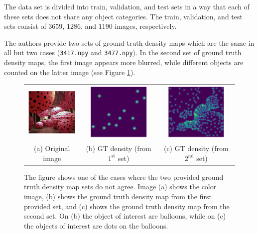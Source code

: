 The data set is divided into train, validation, and test sets in a way that each of these sets does not share any object categories. The train, validation, and test sets consist of $3659$, $1286$, and $1190$ images, respectively.

The authors provide two sets of ground truth density maps which are the same in all but two cases (\texttt{3417.npy} and \texttt{3477.npy}). In the second set of ground truth density maps, the first image appears more blurred, while different objects are counted on the latter image (see Figure \ref{fig:gtsets}).

\begin{figure}[htb]
	\centering
	\begin{tabular}{ccc}
		\includegraphics[width=3.1cm]{fig/ds_3.png} &
		\includegraphics[width=3.1cm]{fig/ds_1.png} &
		\includegraphics[width=3.1cm]{fig/ds_2.png} \\
		(a) Original image & (b) GT density (from $1^{\text{st}}$ set) & (c) GT density (from $2^{\text{nd}}$ set) \\
	\end{tabular}
	\caption{The figure shows one of the cases where the two provided ground truth density map sets do not agree. Image (a) shows the color image, (b) shows the ground truth density map from the first provided set, and (c) shows the ground truth density map from the second set. On (b) the object of interest are balloons, while on (c) the objects of interest are dots on the balloons.}
	\label{fig:gtsets}
\end{figure}

